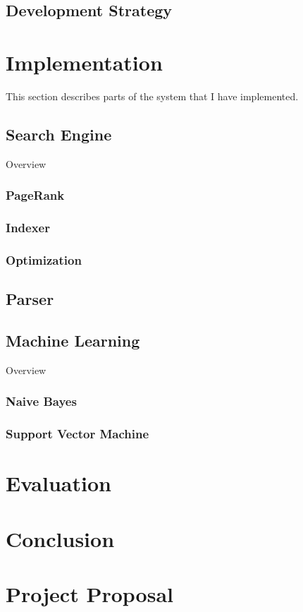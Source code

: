 \documentclass[12pt,twoside,notitlepage]{report}
\begin{document}
\section{Development Strategy}

\cleardoublepage
\chapter{Implementation}
This section describes parts of the system that I have implemented.

\section{Search Engine}
Overview

\subsection{PageRank}
\subsection{Indexer}
\subsection{Optimization}

\section{Parser}

\section{Machine Learning}
Overview
\subsection{Naive Bayes}

\subsection{Support Vector Machine}

\cleardoublepage
\chapter{Evaluation}

\cleardoublepage
\chapter{Conclusion}
\cleardoublepage



\cleardoublepage

\appendix

\chapter{Project Proposal}

%
\end{document}
